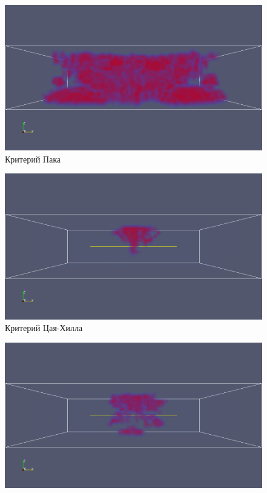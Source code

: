 \documentclass[xcolor={usenames,dvipsnames,svgnames,table}]{beamer}
\begin{document}
\begin{frame}
\begin{center}
\begin{minipage}[h]{0.33\textwidth}
            \begin{figure}[h]
                \includegraphics[width=\textwidth]{png/destruction/x-puck-x-.png}
                \tiny
                \caption{Критерий Пака}
            \end{figure}
        \end{minipage}
        \begin{minipage}[h]{0.33\textwidth}
            \begin{figure}[h]
                \includegraphics[width=\textwidth]{png/destruction/x-tsaihill-x-.png}
                \tiny
                \caption{Критерий Цая-Хилла}
            \end{figure}
        \end{minipage}
        \begin{minipage}[h]{0.33\textwidth}
            \begin{figure}[h]
                \includegraphics[width=\textwidth]{png/destruction/x-tsaiwu-x-.png}

\end{figure}
\end{minipage}
\end{center}
\end{frame}
\end{document}
